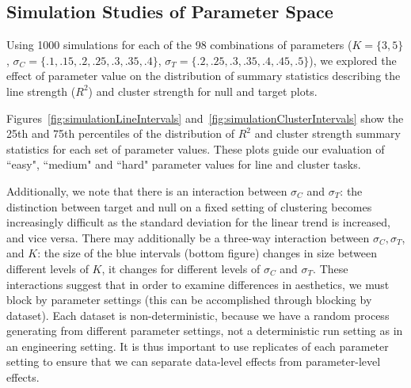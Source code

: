 \documentclass[12pt]{article}\usepackage[]{graphicx}\usepackage[]{color}
\begin{document}


\newpage
\begin{appendix}
\section{Simulation Studies of Parameter Space}\label{app:parametersimulation}

Using 1000 simulations for each of the 98 combinations of parameters ($K=\{3,5\}$, $\sigma_C=\{.1, .15, .2, .25, .3, .35, .4\}$, $\sigma_T=\{.2, .25, .3, .35, .4, .45, .5\}$), we explored the effect of parameter value on the distribution of summary statistics describing the line strength ($R^2$) and cluster strength for null and target plots. 

Figures~\ref{fig:simulationLineIntervals} and~\ref{fig:simulationClusterIntervals} show the 25th and 75th percentiles of the distribution of $R^2$ and cluster strength summary statistics for each set of parameter values. These plots guide our evaluation of ``easy", ``medium" and ``hard" parameter values for line and cluster tasks. 

Additionally, we note that there is an interaction between $\sigma_C$ and $\sigma_T$: the distinction between target and null on a fixed setting of clustering becomes increasingly difficult as the standard deviation for the linear trend is increased, and vice versa. There may additionally be a three-way interaction between $\sigma_C, \sigma_T$, and $K$: the size of the blue intervals (bottom figure) changes in size between different levels of $K$, it changes for different levels of $\sigma_C$ and $\sigma_T$. These interactions suggest that in order to examine differences in aesthetics, we must block by parameter settings (this can be accomplished through blocking by dataset). Each dataset is non-deterministic, because we have a random process generating from different parameter settings, not a deterministic run setting as in an engineering setting. It is thus important to use replicates of each parameter setting to ensure that we can separate data-level effects from parameter-level effects. 




\end{appendix}
\end{document}
